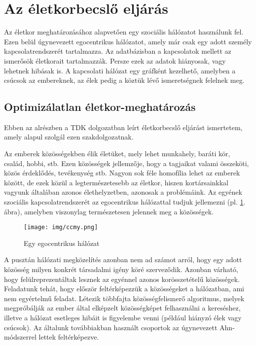 \documentclass[12pt]{article}
\begin{document}
\section{Az életkorbecslő eljárás}
Az életkor meghatározásához alapvetően egy szociális hálózatot használunk fel. Ezen belül úgynevezett egocentrikus hálózatot, amely már csak egy adott személy kapcsolatrendszerét tartalmazza. Az adatbázisban a kapcsolatok mellett az ismerősök életkorait tartalmazzák. Persze ezek az adatok hiányosak, vagy lehetnek hibásak is. A kapcsolati hálózat egy gráfként kezelhető, amelyben a csúcsok az embereknek, az élek pedig a köztük lévő ismeretségnek felelnek meg.

\subsection{Optimizálatlan életkor-meghatározás} \label{eletkor_becsles_tamas_gabor}
Ebben az alrészben a \cite{tamas_gabor_tdk} TDK dolgozatban leírt életkorbecslő eljárást ismertetem, amely alapul szolgál ezen szakdolgozatnak.

Az emberek közösségekben élik életüket, mely lehet munkahely, baráti kör, család, hobbi, stb. Ezen közösségek jellemzője, hogy a tagjaikat valami összeköti, közös érdeklődés, tevékenység stb. Nagyon sok féle homofília lehet az emberek között, de ezek közül a legtermészetesebb az életkor, hiszen kortársainkkal vagyunk általában azonos élethelyzetben, azonosak a problémáink. Az egyének szociális kapcsolatrendszerét az egocentrikus hálózattal tudjuk jellemezni (pl. \ref{egocentrikus}. ábra), amelyben viszonylag természetesen jelennek meg a közösségek.
\begin{figure}[H]
	\centering
	\texttt{[image: img/ccmy.png]}
	\caption{Egy egocentrikus hálózat} %
	\label{egocentrikus}
\end{figure}
A pusztán hálózati megközelítés azonban nem ad számot arról, hogy egy adott közösség milyen konkrét társadalmi igény köré szerveződik. Azonban várható, hogy felülreprezentáltak lesznek az egyénnel azonos korösszetételű közösségek.
Feladatunk tehát, hogy először feltérképezzük a közösségeket a hálózatban, ami nem egyértelmű feladat. Létezik \iffalse TODO: létezik helyett valami más szó \fi többfajta közösségfelismerő algoritmus, melyek megpróbálják az ember által elképzelt közösségképet felhasználni a kereséshez, illetve a hálózat esetleges hibáit is figyelembe venni (például hiányzó élek vagy csúcsok). Az általunk továbbiakban használt csoportok az úgynevezett Ahn-módszerrel \cite{tamas_gabor_tdk} \iffalse TODO: kell ez? \fi lettek feltérképezve. %
\end{document}

